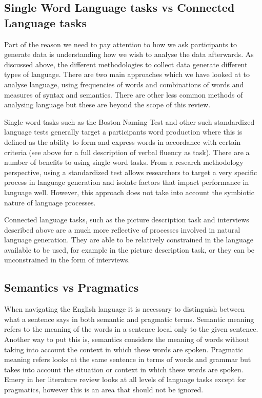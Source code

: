 \documentclass[10pt, letterpaper, twoside, openany]{book}
\begin{document}
\subsection{Single Word Language tasks vs Connected Language tasks}
Part of the reason we need to pay attention to how we ask participants to generate data is understanding how we wish to analyse the data afterwards. As discussed above, the different methodologies to collect data generate different types of language. There are two main approaches which we have looked at to analyse language, using frequencies of words and combinations of words and measures of syntax and semantics. There are other less common methods of analysing language but these are beyond the scope of this review.
\par
Single word tasks such as the Boston Naming Test and other such standardized language tests generally target a participants word production where this is defined as the ability to form and express words in accordance with certain criteria (see above for a full description of verbal fluency as task). There are a number of benefits to using single word tasks. From a research methodology perspective, using a standardized test allows researchers to target a very specific process in language generation and isolate factors that impact performance in language well. However, this approach does not take into account the symbiotic nature of language processes.
\par
Connected language tasks, such as the picture description task and interviews described above are a much more reflective of processes involved in natural language generation. They are able to be relatively constrained in the language available to be used, for example in the picture description task, or they can be unconstrained in the form of interviews. %
\par
\subsection{Semantics vs Pragmatics}
When navigating the English language it is necessary to distinguish between what a sentence says in both semantic and pragmatic terms. Semantic meaning refers to the meaning of the words in a sentence local only to the given sentence. Another way to put this is, semantics considers the meaning of words without taking into account the context in which these words are spoken. Pragmatic meaning refers looks at the same sentence in terms of words and grammar but takes into account the situation or context in which these words are spoken. Emery in her literature review looks at all levels of language tasks except for pragmatics, however this is an area that should not be ignored.
\par
\end{document}

